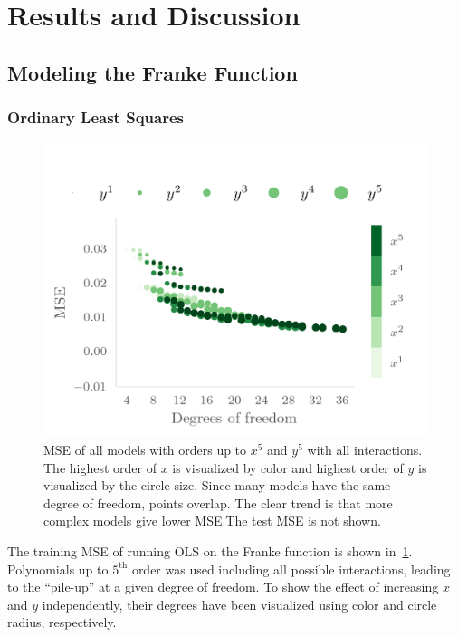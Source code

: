 \section{Results and Discussion}\label{sec:Discussion}

\subsection{Modeling the Franke Function}
\label{sec:model-franke-funct}

\subsubsection{Ordinary Least Squares}
\begin{figure}[]
  \centering
  \includegraphics[]{figures/ols_group.png}
  \caption{\label{fig:olscgrouped} MSE of all models with orders up to \(x^{5}\)
  and \(y^{5}\) with all interactions. The highest order of \(x\) is visualized
  by color and highest order of \(y\) is visualized by the circle size. Since many
  models have the same degree of freedom, points overlap. The clear trend is
  that more complex models give lower MSE.\@ The test MSE is not shown.}
\end{figure}

The training MSE of running OLS on the Franke function is shown
in~\cref{fig:olscgrouped}. Polynomials up to \(5^{\text{th}}\) order was used including all possible
interactions, leading to the ``pile-up'' at a given degree of freedom. To show
the effect of increasing \(x\) and \(y\) independently, their degrees have been
visualized using color and circle radius, respectively.

